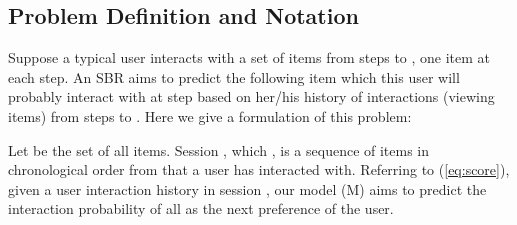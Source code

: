 \documentclass[3p, preprint, times]{elsarticle}
\begin{document}
\subsection{Problem Definition and Notation}
Suppose a typical user interacts with a set of items from steps  to , one item at each step. An SBR aims to predict the following item which this user will probably interact with at step  based on her/his history of interactions (viewing items) from steps  to . Here we give a formulation of this problem:

Let  be the set of all items. Session , which , is a sequence of items in chronological order from  that a user has interacted with. Referring to (\ref{eq:score}), given a user interaction history in session , our model (M) aims to predict the interaction probability of all   as the next preference of the user.
\end{document}
